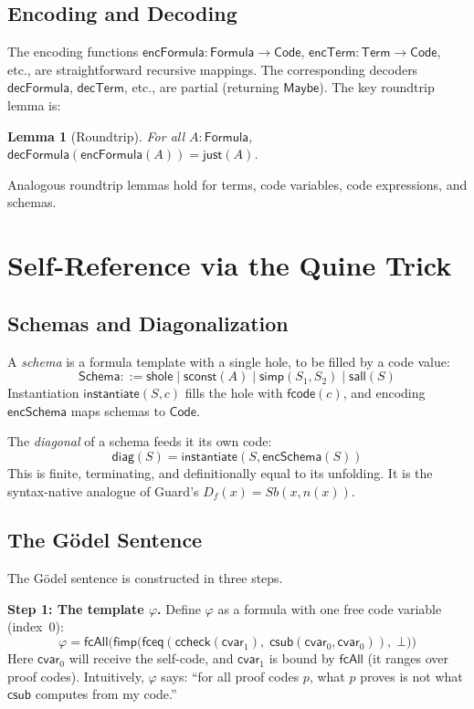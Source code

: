 \documentclass[11pt]{article}
\newtheorem{lemma}[theorem]{Lemma}
\newcommand{\Code}{\mathsf{Code}}
\newcommand{\Formula}{\mathsf{Formula}}
\newcommand{\Term}{\mathsf{Term}}
\newcommand{\Schema}{\mathsf{Schema}}
\newcommand{\decFormula}{\mathsf{decFormula}}
\newcommand{\encFormula}{\mathsf{encFormula}}
\newcommand{\csub}{\mathsf{csub}}
\newcommand{\ccheck}{\mathsf{ccheck}}
\newcommand{\cvar}{\mathsf{cvar}}
\newcommand{\fbot}{\bot}
\newcommand{\fimp}{\mathsf{fimp}}
\newcommand{\fcode}{\mathsf{fcode}}
\newcommand{\fceq}{\mathsf{fceq}}
\newcommand{\fcAll}{\mathsf{fcAll}}
\begin{document}
\subsection{Encoding and Decoding}

The encoding functions $\encFormula : \Formula \to \Code$,
$\mathsf{encTerm} : \Term \to \Code$, etc., are straightforward
recursive mappings. The corresponding decoders $\decFormula$,
$\mathsf{decTerm}$, etc., are partial (returning $\mathsf{Maybe}$).
The key roundtrip lemma is:

\begin{lemma}[Roundtrip]
  \label{lem:roundtrip}
  For all $A : \Formula$,
  $\decFormula(\encFormula(A)) = \mathsf{just}(A)$.
\end{lemma}

Analogous roundtrip lemmas hold for terms, code variables, code
expressions, and schemas.

\section{Self-Reference via the Quine Trick}
\label{sec:quine}

\subsection{Schemas and Diagonalization}

A \emph{schema} is a formula template with a single hole, to be filled
by a code value:
\[
  \Schema ::= \mathsf{shole}
    \mid \mathsf{sconst}(A)
    \mid \mathsf{simp}(S_1, S_2)
    \mid \mathsf{sall}(S)
\]
Instantiation $\mathsf{instantiate}(S, c)$ fills the hole with
$\fcode(c)$, and encoding $\mathsf{encSchema}$ maps schemas to $\Code$.

The \emph{diagonal} of a schema feeds it its own code:
\[
  \mathsf{diag}(S) = \mathsf{instantiate}(S, \mathsf{encSchema}(S))
\]
This is finite, terminating, and definitionally equal to its unfolding.
It is the syntax-native analogue of Guard's $D_f(x) = Sb(x, n(x))$.

\subsection{The G\"odel Sentence}

The G\"odel sentence is constructed in three steps.

\medskip
\noindent\textbf{Step 1: The template $\varphi$.}
Define $\varphi$ as a formula with one free code variable (index~0):
\[
  \varphi = \fcAll\bigl(\fimp\bigl(
    \fceq(\ccheck(\cvar_1),\; \csub(\cvar_0, \cvar_0)),\;
    \fbot\bigr)\bigr)
\]
Here $\cvar_0$ will receive the self-code, and $\cvar_1$ is bound by
$\fcAll$ (it ranges over proof codes). Intuitively, $\varphi$ says:
``for all proof codes $p$, what $p$ proves is not what $\csub$ computes
from my code.''
\end{document}
